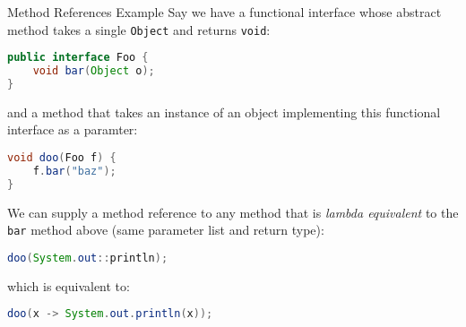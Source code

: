 \documentclass{beamer}
\begin{document}
\begin{frame}[fragile]{Method References Example}
\vspace{-.05in}
Say we have a functional interface whose abstract method takes a single {\tt Object} and returns {\tt void}:
\vspace{-.05in}
\begin{lstlisting}[language=Java]
public interface Foo {
    void bar(Object o);
}
\end{lstlisting}
\vspace{-.05in}
and a method that takes an instance of an object implementing this functional interface as a paramter:
\vspace{-.05in}
\begin{lstlisting}[language=Java]
void doo(Foo f) {
    f.bar("baz");
}
\end{lstlisting}
\vspace{-.05in}
We can supply a method reference to any method that is {\it lambda equivalent} to the {\tt bar} method above (same parameter list and return type):
\vspace{-.05in}
\begin{lstlisting}[language=Java]
doo(System.out::println);
\end{lstlisting}
\vspace{-.05in}
 which is equivalent to:
\vspace{-.05in}
\begin{lstlisting}[language=Java]
doo(x -> System.out.println(x));
\end{lstlisting}

\end{frame}
\end{document}
